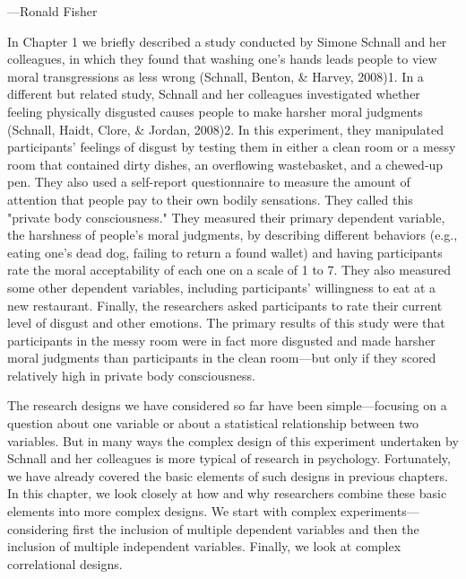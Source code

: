  {---Ronald Fisher}

In Chapter 1 we briefly described a study conducted by Simone Schnall and her colleagues, in which they found that washing one's hands leads people to view moral transgressions as less wrong (Schnall, Benton, \& Harvey, 2008)1. In a different but related study, Schnall and her colleagues investigated whether feeling physically disgusted causes people to make harsher moral judgments (Schnall, Haidt, Clore, \& Jordan, 2008)2. In this experiment, they manipulated participants' feelings of disgust by testing them in either a clean room or a messy room that contained dirty dishes, an overflowing wastebasket, and a chewed-up pen. They also used a self-report questionnaire to measure the amount of attention that people pay to their own bodily sensations. They called this "private body consciousness." They measured their primary dependent variable, the harshness of people's moral judgments, by describing different behaviors (e.g., eating one's dead dog, failing to return a found wallet) and having participants rate the moral acceptability of each one on a scale of 1 to 7. They also measured some other dependent variables, including participants' willingness to eat at a new restaurant. Finally, the researchers asked participants to rate their current level of disgust and other emotions. The primary results of this study were that participants in the messy room were in fact more disgusted and made harsher moral judgments than participants in the clean room---but only if they scored relatively high in private body consciousness.

The research designs we have considered so far have been simple---focusing on a question about one variable or about a statistical relationship between two variables. But in many ways the complex design of this experiment undertaken by Schnall and her colleagues is more typical of research in psychology. Fortunately, we have already covered the basic elements of such designs in previous chapters. In this chapter, we look closely at how and why researchers combine these basic elements into more complex designs. We start with complex experiments---considering first the inclusion of multiple dependent variables and then the inclusion of multiple independent variables. Finally, we look at complex correlational designs.

